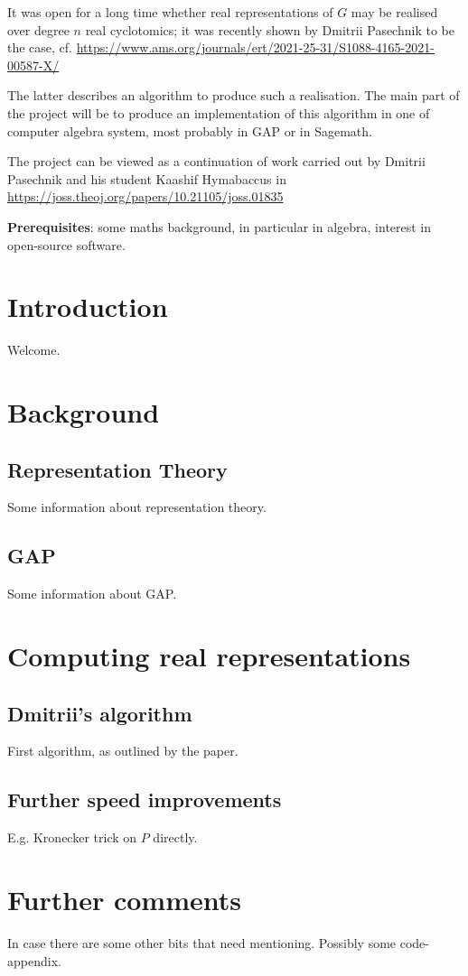 \documentclass[11pt]{article}
\begin{document}
It was open for a long time whether real representations of $G$ may be realised
over degree $n$ real cyclotomics; it was recently shown by Dmitrii Pasechnik to be
the case, cf. \cite{Pas21} \url{https://www.ams.org/journals/ert/2021-25-31/S1088-4165-2021-00587-X/}

The latter describes an algorithm to produce such a realisation. The main part of the
project will be to produce an implementation of this algorithm in one of computer
algebra system, most probably in GAP or in Sagemath.

The project can be viewed as a continuation of work carried out by Dmitrii Pasechnik
and his student Kaashif Hymabaccus in \url{https://joss.theoj.org/papers/10.21105/joss.01835}

\textbf{Prerequisites}: some maths background, in particular in algebra, interest in open-source software.

\newpage

\tableofcontents

\newpage

\section{Introduction}

Welcome.

\section{Background}

\subsection{Representation Theory}

Some information about representation theory.

\subsection{GAP}

Some information about GAP.

\section{Computing real representations}

\subsection{Dmitrii's algorithm}

First algorithm, as outlined by the paper.

\subsection{Further speed improvements}

E.g. Kronecker trick on $P$ directly.

\section{Further comments}

In case there are some other bits that need mentioning. Possibly some code-appendix.



\end{document}
